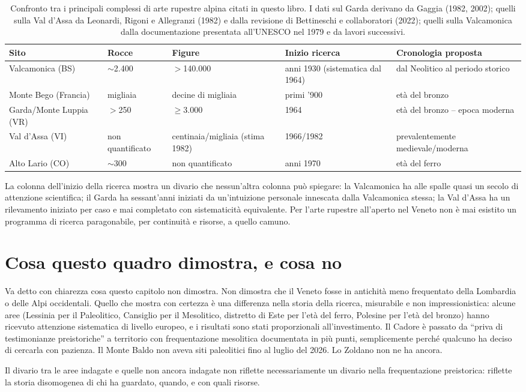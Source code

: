 \begin{table}[htbp]
\centering
\small
\begin{tabular}{@{}p{2.6cm}p{1.6cm}p{1.8cm}p{1.6cm}p{2.4cm}@{}}
\toprule
\textbf{Sito} & \textbf{Rocce} & \textbf{Figure} & \textbf{Inizio ricerca} & \textbf{Cronologia proposta} \\
\midrule
Valcamonica (BS) & $\sim$2.400 & $>$140.000 & anni 1930 (sistematica dal 1964) & dal Neolitico al periodo storico \\
Monte Bego (Francia) & migliaia & decine di migliaia & primi '900 & età del bronzo \\
Garda/Monte Luppia (VR) & $>$250 & $\geq$3.000 & 1964 & età del bronzo -- epoca moderna \\
Val d'Assa (VI) & non quantificato & centinaia/migliaia (stima 1982) & 1966/1982 & prevalentemente medievale/moderna \\
Alto Lario (CO) & $\sim$300 & non quantificato & anni 1970 & età del ferro \\
\bottomrule
\end{tabular}
\caption{Confronto tra i principali complessi di arte rupestre alpina citati in questo libro. I dati sul Garda derivano da Gaggia (1982, 2002); quelli sulla Val d'Assa da Leonardi, Rigoni e Allegranzi (1982) e dalla revisione di Bettineschi e collaboratori (2022); quelli sulla Valcamonica dalla documentazione presentata all'UNESCO nel 1979 e da lavori successivi.}
\label{tab:confronto_siti}
\end{table}

La colonna dell'inizio della ricerca mostra un divario che nessun'altra colonna può spiegare: la Valcamonica ha alle spalle quasi un secolo di attenzione scientifica; il Garda ha sessant'anni iniziati da un'intuizione personale innescata dalla Valcamonica stessa; la Val d'Assa ha un rilevamento iniziato per caso e mai completato con sistematicità equivalente. Per l'arte rupestre all'aperto nel Veneto non è mai esistito un programma di ricerca paragonabile, per continuità e risorse, a quello camuno.

\section{Cosa questo quadro dimostra, e cosa no}

Va detto con chiarezza cosa questo capitolo non dimostra. Non dimostra che il Veneto fosse in antichità meno frequentato della Lombardia o delle Alpi occidentali. Quello che mostra con certezza è una differenza nella storia della ricerca, misurabile e non impressionistica: alcune aree (Lessinia per il Paleolitico, Cansiglio per il Mesolitico, distretto di Este per l'età del ferro, Polesine per l'età del bronzo) hanno ricevuto attenzione sistematica di livello europeo, e i risultati sono stati proporzionali all'investimento. Il Cadore è passato da ``priva di testimonianze preistoriche'' a territorio con frequentazione mesolitica documentata in più punti, semplicemente perché qualcuno ha deciso di cercarla con pazienza. Il Monte Baldo non aveva siti paleolitici fino al luglio del 2026. Lo Zoldano non ne ha ancora.

Il divario tra le aree indagate e quelle non ancora indagate non riflette necessariamente un divario nella frequentazione preistorica: riflette la storia disomogenea di chi ha guardato, quando, e con quali risorse.
